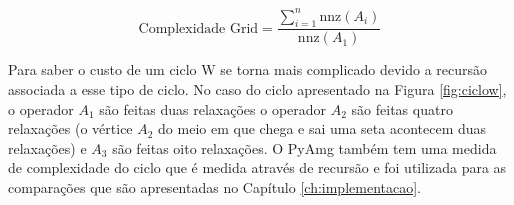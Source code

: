 \begin{equation}\label{eq:complexidadegrid}
    \text{Complexidade Grid} = \frac{\sum_{i=1}^n \text{nnz}(A_i)}{\text{nnz}(A_1)}
\end{equation}

Para saber o custo de um ciclo W se torna mais complicado devido a recursão associada a esse tipo de ciclo. No caso do ciclo apresentado na Figura \ref{fig:ciclow}, o operador $A_1$ são feitas duas relaxações o operador $A_2$ são feitas quatro relaxações (o vértice $A_2$ do meio em que chega e sai uma seta acontecem duas relaxações) e $A_3$ são feitas oito relaxações. O PyAmg também tem uma medida de complexidade do ciclo que é medida através de recursão e foi utilizada para as comparações que são apresentadas no Capítulo \ref{ch:implementacao}. 







